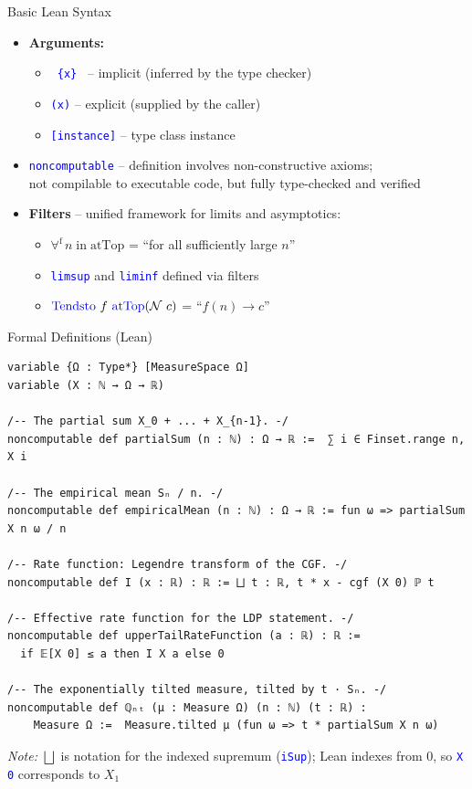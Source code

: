 \documentclass[aspectratio=169]{beamer}
\newcommand{\leancode}[1]{\textcolor{blue}{\nolinkurl{#1}}}
\begin{document}
\begin{frame}[fragile]{Basic Lean Syntax}
  \begin{itemize}
    \item \textbf{Arguments:}
      \begin{itemize}
        \item \leancode{ {x} } -- implicit (inferred by the type checker)
        \item \leancode{(x)} -- explicit (supplied by the caller)
        \item \leancode{[instance]} -- type class instance
      \end{itemize}
      \vspace{0.2cm}
    \item \leancode{noncomputable} -- definition involves non-constructive axioms;\\
      not compilable to executable code, but fully type-checked and verified
      \vspace{0.2cm}
    \item \textbf{Filters} -- unified framework for limits and asymptotics:
      \begin{itemize}
        \item $\forall^\text{f}\, n\;\text{in}\;\text{atTop}$ = ``for all sufficiently large $n$''
        \item \leancode{limsup} and \leancode{liminf} defined via filters
        \item $\textcolor{blue}{\text{Tendsto}}~f~\textcolor{blue}{\text{atTop}} (\mathcal{N}~c)$ = ``$f(n) \to c$''
      \end{itemize}
  \end{itemize}
\end{frame}

\begin{frame}[fragile]{Formal Definitions (Lean)}
\begin{lstlisting}[basicstyle=\ttfamily\scriptsize]
variable {Ω : Type*} [MeasureSpace Ω]
variable (X : ℕ → Ω → ℝ)

/-- The partial sum X_0 + ... + X_{n-1}. -/
noncomputable def partialSum (n : ℕ) : Ω → ℝ :=  ∑ i ∈ Finset.range n, X i

/-- The empirical mean Sₙ / n. -/
noncomputable def empiricalMean (n : ℕ) : Ω → ℝ := fun ω => partialSum X n ω / n

/-- Rate function: Legendre transform of the CGF. -/
noncomputable def I (x : ℝ) : ℝ := ⨆ t : ℝ, t * x - cgf (X 0) ℙ t

/-- Effective rate function for the LDP statement. -/
noncomputable def upperTailRateFunction (a : ℝ) : ℝ :=
  if 𝔼[X 0] ≤ a then I X a else 0

/-- The exponentially tilted measure, tilted by t · Sₙ. -/
noncomputable def ℚₙₜ (μ : Measure Ω) (n : ℕ) (t : ℝ) :
    Measure Ω :=  Measure.tilted μ (fun ω => t * partialSum X n ω)
\end{lstlisting}
  {\small\textit{Note:} $\bigsqcup$ is notation for the indexed supremum (\leancode{iSup}); Lean indexes from 0, so \leancode{X} \leancode{0} corresponds to $X_1$}
\end{frame}
\end{document}
